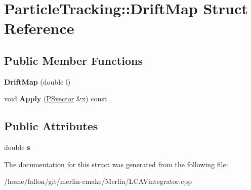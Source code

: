 \hypertarget{structParticleTracking_1_1DriftMap}{}\section{Particle\+Tracking\+:\+:Drift\+Map Struct Reference}
\label{structParticleTracking_1_1DriftMap}
\subsection*{Public Member Functions}
\begin{DoxyCompactItemize}
\item 
\mbox{\label{structParticleTracking_1_1DriftMap_ae8a4b596efe78885579de4aebecbc9a2}} 
{\bfseries Drift\+Map} (double l)
\item 
\mbox{\label{structParticleTracking_1_1DriftMap_a88e2c1d56ebeaf11fe0d8507ad07e48d}} 
void {\bfseries Apply} (\hyperlink{classPSvector}{P\+Svector} \&x) const
\end{DoxyCompactItemize}
\subsection*{Public Attributes}
\begin{DoxyCompactItemize}
\item 
\mbox{\label{structParticleTracking_1_1DriftMap_a0d11b751191b5bb65c8a3303ed479e1f}} 
double {\bfseries s}
\end{DoxyCompactItemize}


The documentation for this struct was generated from the following file\+:\begin{DoxyCompactItemize}
\item 
/home/fallon/git/merlin-\/cmake/\+Merlin/L\+C\+A\+Vintegrator.\+cpp\end{DoxyCompactItemize}

